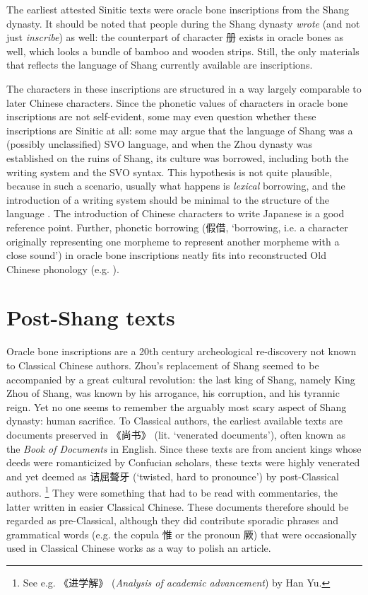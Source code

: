 \documentclass[UTF8, a4paper, oneside, scheme=plain, 12pt]{ctexrep}
\newcommand*{\citepage}[1]{p.~{#1}}
\newcommand*{\citepages}[1]{pp.~{#1}}
\newcommand{\work}[1]{\textit{#1}}
\newcommand{\translate}[1]{`#1'}
\begin{document}
The earliest attested Sinitic texts were oracle bone inscriptions from the Shang dynasty.
It should be noted that people during the Shang dynasty \emph{wrote} (and not just \emph{inscribe}) as well:
the counterpart of character 册 exists in oracle bones as well,
which looks a bundle of bamboo and wooden strips.
Still, the only materials that reflects the language of Shang currently available are inscriptions.

The characters in these inscriptions are structured in a way largely comparable to later Chinese characters.
Since the phonetic values of characters in oracle bone inscriptions are not self-evident,
some may even question whether these inscriptions are Sinitic at all:
some may argue that the language of Shang was a (possibly unclassified) SVO language,
and when the Zhou dynasty was established on the ruins of Shang,
its culture was borrowed, including both the writing system and the SVO syntax.
This hypothesis is not quite plausible, because in such a scenario, usually what happens is \emph{lexical} borrowing,
and the introduction of a writing system should be minimal to the structure of the language
\citep[\citepage{88}]{delancey2013origins}.
The introduction of Chinese characters to write Japanese is a good reference point.
Further, phonetic borrowing (假借, \translate{borrowing, i.e. a character originally representing one morpheme to represent another morpheme with a close sound}) in oracle bone inscriptions
neatly fits into reconstructed Old Chinese phonology
(e.g. \citealt[\citepages{115}]{baxter2014old}).


\section{Post-Shang texts}\label{sec:intro.pre-classical.post-shang}

Oracle bone inscriptions are 
a 20th century archeological re-discovery not known to Classical Chinese authors.
Zhou's replacement of Shang seemed to be accompanied by a great cultural revolution:
the last king of Shang, namely King Zhou of Shang, was known by 
his arrogance, his corruption, and his tyrannic reign.
Yet no one seems to remember the arguably most scary aspect of Shang dynasty: human sacrifice.
To Classical authors, the earliest available texts are 
documents preserved in 《尚书》 (lit. \translate{venerated documents}),
often known as the \work{Book of Documents} in English.
Since these texts are from ancient kings 
whose deeds were romanticized by Confucian scholars,
these texts were highly venerated and yet deemed as
诘屈聱牙 (\translate{twisted, hard to pronounce})
by post-Classical authors.%
\footnote{
    See e.g. 《进学解》 (\work{Analysis of academic advancement}) by Han Yu.
}
They were something that had to be read with commentaries,
the latter written in easier Classical Chinese.
These documents therefore should be regarded as pre-Classical,
although they did contribute sporadic phrases
and grammatical words (e.g. the copula 惟 or the pronoun 厥)
that were occasionally used in Classical Chinese works as a way to polish an article.
\end{document}
